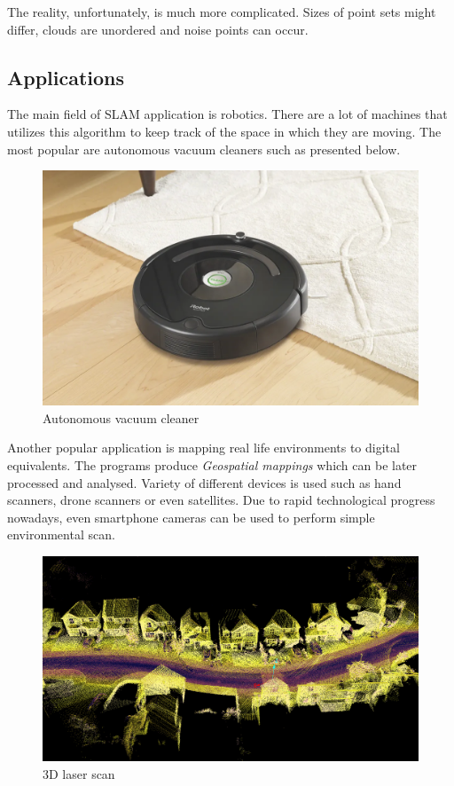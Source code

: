 \documentclass[titlepage]{article}
\begin{document}
The reality, unfortunately, is much more complicated. Sizes of point sets might differ, clouds are unordered and noise points can occur.

\subsection{Applications}
The main field of SLAM application is robotics. There are a lot of machines that utilizes this algorithm to keep track of the space in which they are moving. The most popular are autonomous vacuum cleaners such as presented below.

\begin{figure}[H]
\includegraphics[width=\textwidth]{ms-img1.png}
\caption{Autonomous vacuum cleaner}
\end{figure}

Another popular application is mapping real life environments to digital equivalents. The programs produce \textit{Geospatial mappings} which can be later processed and analysed. Variety of different devices is used such as hand scanners, drone scanners or even satellites. Due to rapid technological progress nowadays, even smartphone cameras can be used to perform simple environmental scan.

\begin{figure}[H]
\includegraphics[width=\textwidth]{ms-img2.jpg}
\caption{3D laser scan}
\end{figure}
\end{document}
